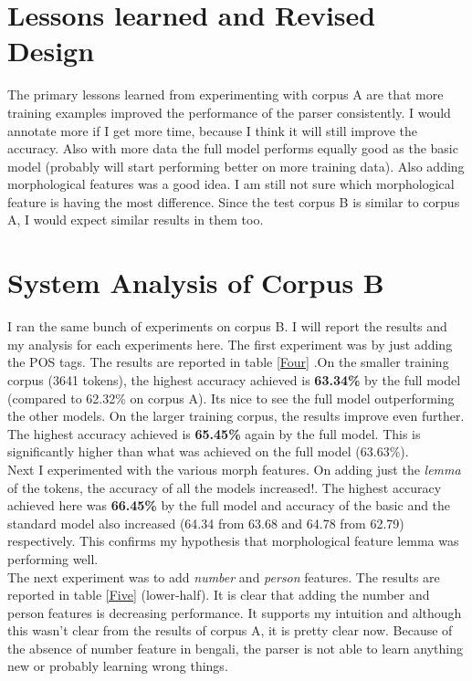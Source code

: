 \documentclass[11pt,letterpaper]{article}
\begin{document}
\section{Lessons learned and Revised Design}
The primary lessons learned from experimenting with corpus A are that more training examples improved the performance of the parser consistently. I would annotate more if I get more time, because I think it will still improve the accuracy. Also with more data the full model performs equally good as the basic model (probably will start performing better on more training data). Also adding morphological features was a good idea. I am still not sure which morphological feature is having the most difference. Since the test corpus B is similar to corpus A, I would expect similar results in them too.


\section{System Analysis of Corpus B}

I ran the same bunch of experiments on corpus B. I will report the results and my analysis for each experiments here. The first experiment was by just adding the POS tags. The results are reported in table \ref{Four} .On the smaller training corpus (3641 tokens), the highest accuracy achieved is \textbf{63.34\%} by the full model (compared to 62.32\% on corpus A). Its nice to see the full model outperforming the other models. On the larger training corpus, the results improve even further. The highest accuracy achieved is \textbf{65.45\%} again by the full model. This is significantly higher than what was achieved on the full model (63.63\%). \\

Next I experimented with the various morph features. On adding just the \textit{lemma} of the tokens, the accuracy of all the models increased!. The highest accuracy achieved here was \textbf{66.45\%} by the full model and accuracy of the basic and the standard model also increased (64.34 from 63.68 and 64.78 from 62.79) respectively. This confirms my hypothesis that morphological feature lemma was performing well. \\

The next experiment was to add \textit{number} and \textit{person} features. The results are reported in table \ref{Five} (lower-half). It is clear that adding the number and person features is decreasing performance. It supports my intuition and although this wasn't clear from the results of corpus A, it is pretty clear now. Because of the absence of number feature in bengali, the parser is not able to learn anything new or probably learning wrong things. \\
\end{document}
